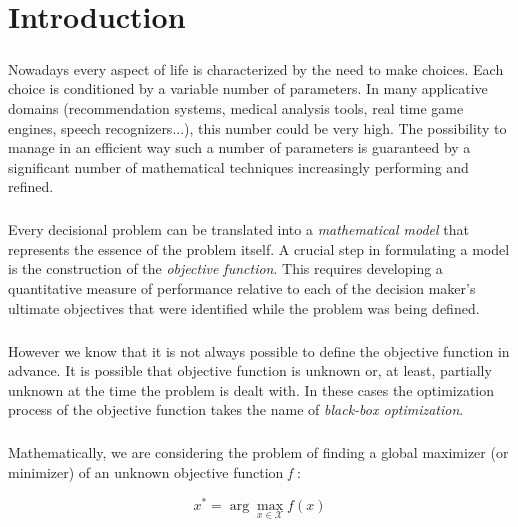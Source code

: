 \chapter{Introduction}

\paragraph{} Nowadays every aspect of life is characterized by the need to make choices. Each choice is conditioned by a variable number of parameters. In many applicative domains (recommendation systems, medical analysis tools, real time game engines, speech recognizers...), this number could be very high.  The possibility to manage in an efficient way such a number of parameters is guaranteed by a significant number of mathematical techniques increasingly performing and refined.  

\paragraph{} Every decisional problem can be translated into a \textit{mathematical model} that represents the essence of the problem itself. A crucial step in formulating a model is the construction of the \textit{objective function}. This requires developing a quantitative measure of performance relative to each of the decision maker’s ultimate objectives that were identified while the problem was being defined.~\cite{HillLieb01}

\paragraph{} However we know that it is not always possible to define the objective function in advance. It is possible that objective function is unknown or, at least, partially unknown at the time the problem is dealt with. 
In these cases the optimization process of the objective function takes the name of \textit{black-box optimization}.

\paragraph{} Mathematically, we are considering the problem of finding a global maximizer (or minimizer) of an unknown objective function \textit{f} :

\begin{equation}
x^* = \arg \max_{x \in \mathcal{X}} f(x)
\end{equation}

